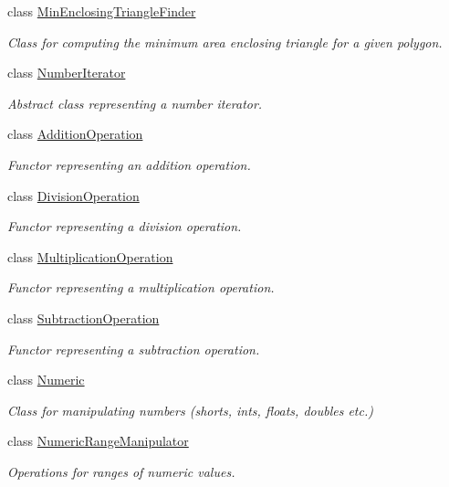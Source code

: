 \begin{DoxyCompactItemize}
class \hyperlink{classmultiscale_1_1MinEnclosingTriangleFinder}{Min\-Enclosing\-Triangle\-Finder}
\begin{DoxyCompactList}\small\item\em Class for computing the minimum area enclosing triangle for a given polygon. \end{DoxyCompactList}\item 
class \hyperlink{classmultiscale_1_1NumberIterator}{Number\-Iterator}
\begin{DoxyCompactList}\small\item\em Abstract class representing a number iterator. \end{DoxyCompactList}\item 
class \hyperlink{classmultiscale_1_1AdditionOperation}{Addition\-Operation}
\begin{DoxyCompactList}\small\item\em Functor representing an addition operation. \end{DoxyCompactList}\item 
class \hyperlink{classmultiscale_1_1DivisionOperation}{Division\-Operation}
\begin{DoxyCompactList}\small\item\em Functor representing a division operation. \end{DoxyCompactList}\item 
class \hyperlink{classmultiscale_1_1MultiplicationOperation}{Multiplication\-Operation}
\begin{DoxyCompactList}\small\item\em Functor representing a multiplication operation. \end{DoxyCompactList}\item 
class \hyperlink{classmultiscale_1_1SubtractionOperation}{Subtraction\-Operation}
\begin{DoxyCompactList}\small\item\em Functor representing a subtraction operation. \end{DoxyCompactList}\item 
class \hyperlink{classmultiscale_1_1Numeric}{Numeric}
\begin{DoxyCompactList}\small\item\em Class for manipulating numbers (shorts, ints, floats, doubles etc.) \end{DoxyCompactList}\item 
class \hyperlink{classmultiscale_1_1NumericRangeManipulator}{Numeric\-Range\-Manipulator}
\begin{DoxyCompactList}\small\item\em Operations for ranges of numeric values. \end{DoxyCompactList}\item 

\end{DoxyCompactItemize}
